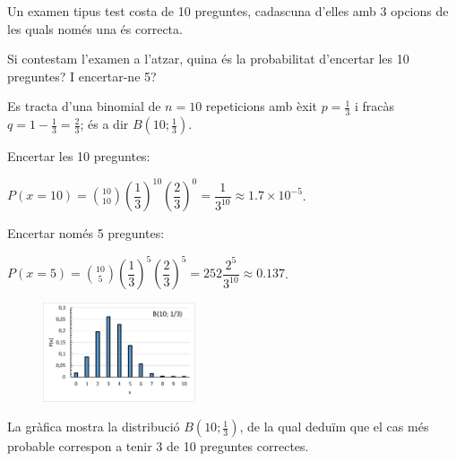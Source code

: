 \begin{resolt}[E]{
	Un examen tipus test costa de 10 preguntes, cadascuna d'elles amb 3 opcions de les quals només una és correcta.
	
	 Si contestam l'examen a l'atzar, quina és la probabilitat d'encertar les 10 preguntes? I encertar-ne 5?
	}
	Es tracta d'una binomial de $n=10$ repeticions amb èxit $p=\frac{1}{3}$ i fracàs $q=1-\frac{1}{3}=\frac{2}{3}$; és a dir $B\left(10; \frac{1}{3}\right)$.\vspace{0.25cm}
	
	Encertar les 10 preguntes:\vspace{0.25cm}
	
	 $P(x=10)=\binom{10}{10} \left(\dfrac{1}{3}\right)^{10} \left(\dfrac{2}{3}\right)^{0} = \dfrac{1}{3^{10}} \approx 1.7\times 10^{-5}$.\vspace{0.25cm}
	
	Encertar només 5 preguntes:\vspace{0.25cm}
	
	 $P(x=5)=\binom{10}{5} \left(\dfrac{1}{3}\right)^{5} \left(\dfrac{2}{3}\right)^{5} = 252 \dfrac{2^5}{3^{10}} \approx   0.137$.\vspace{0.25cm}
	 
	 	\begin{figure} 
	 	\vspace{-0.25cm}
	 	\begin{center}
	 		\includegraphics[width=0.4\textwidth]{img-12/binom1}
	 	\end{center}
	  
	 \end{figure}
 
	 La gràfica mostra la distribució $B\left(10; \frac{1}{3}\right)$, de la qual deduïm que el cas més probable correspon a tenir 3 de 10 preguntes correctes.
	 \vspace{1.5cm}
	
\end{resolt}
\vspace{0.5cm}

